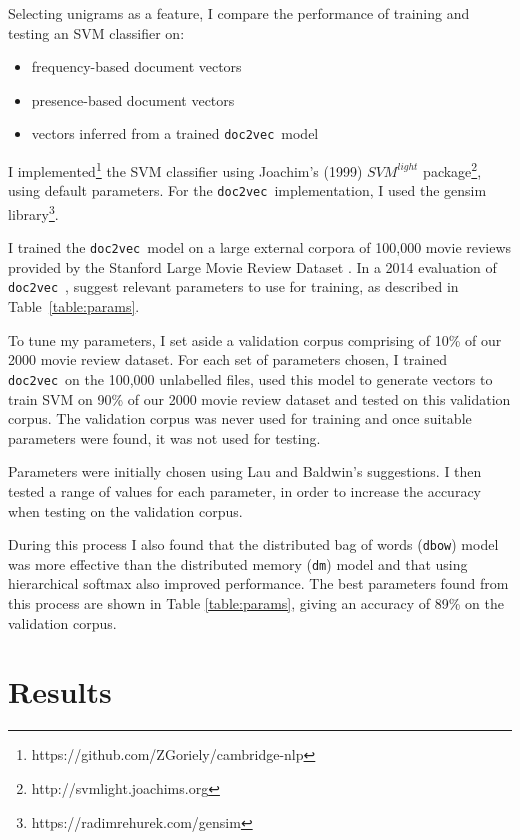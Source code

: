 \documentclass[12pt]{article}
\newcommand{\docvec}{\texttt{doc2vec}}
\begin{document}
\begin{multicols}{2}
Selecting unigrams as a feature, I compare the performance of training and testing an SVM classifier on:
\vspace{-\topsep}
\begin{itemize}
\setlength{\parskip}{0pt}
\setlength{\itemsep}{0pt plus 1pt}
	\item frequency-based document vectors
	\item presence-based document vectors
	\item vectors inferred from a trained \docvec~model
\end{itemize}

I implemented\footnote{https://github.com/ZGoriely/cambridge-nlp} the SVM classifier using Joachim's (1999) $SVM^{light}$ package\footnote{http://svmlight.joachims.org}, using default parameters. For the \docvec~implementation, I used the gensim library\footnote{https://radimrehurek.com/gensim}.

I trained the \docvec~model on a large external corpora of 100,000 movie reviews provided by the Stanford Large Movie Review Dataset \citep{maas-EtAl:2011:ACL-HLT2011}. In a 2014 evaluation of \docvec~, \citet{lau2016empirical} suggest relevant parameters to use for training, as described in Table~\ref{table:params}. 

To tune my parameters, I set aside a validation corpus comprising of 10\% of our 2000 movie review dataset. For each set of parameters chosen, I trained \docvec~on the 100,000 unlabelled files, used this model to generate vectors to train SVM on 90\% of our 2000 movie review dataset and tested on this validation corpus. The validation corpus was never used for training and once suitable parameters were found, it was not used for testing.

Parameters were initially chosen using Lau and Baldwin's suggestions. I then tested a range of values for each parameter, in order to increase the accuracy when testing on the validation corpus. 

During this process I also found that the distributed bag of words (\texttt{dbow}) model was more effective than the distributed memory (\texttt{dm}) model and that using hierarchical softmax also improved performance. The best parameters found from this process are shown in Table \ref{table:params}, giving an accuracy of 89\% on the validation corpus.

\section{Results}


\end{multicols}
\end{document}
